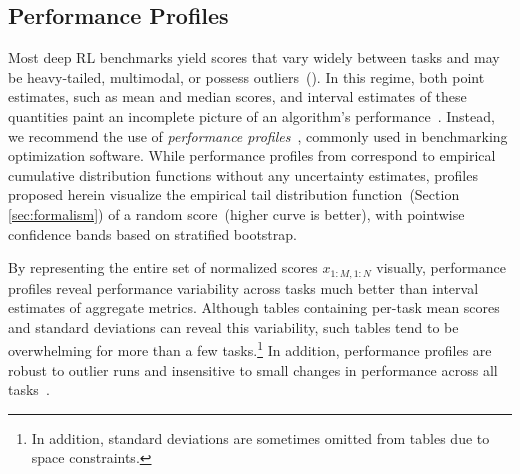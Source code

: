 
\vspace{-0.25cm}
\subsection{Performance Profiles}
\label{subsec:perf_profiles}
\vspace{-0.1cm}
Most deep RL benchmarks yield scores that vary widely between tasks and may be heavy-tailed, multimodal, or possess outliers~(\eg {}). In this regime, both point estimates, such as mean and median scores, and interval estimates of these quantities paint an incomplete picture of an algorithm's performance~\citep[][Section 3]{dehghani2021benchmark}. Instead, we recommend the use of \emph{performance profiles}~\citep{dolan2002benchmarking}, commonly used in benchmarking optimization software. While performance profiles from \citet{dolan2002benchmarking} correspond to empirical cumulative distribution functions without any uncertainty estimates, profiles proposed herein visualize the empirical tail distribution function~(Section \ref{sec:formalism}) of a random score~(higher curve is better),  with pointwise confidence bands based on stratified bootstrap. 


By representing the entire set of normalized scores $x_{1:M, 1:N}$ visually, performance profiles reveal performance variability across tasks much better than interval estimates of aggregate metrics. Although tables containing per-task mean scores and standard deviations can reveal this variability, such tables tend to be overwhelming for more than a few tasks.\footnote{In addition, standard deviations are sometimes omitted from tables due to space constraints.}
In addition, performance profiles are robust to outlier runs and insensitive to small changes in performance across all tasks~\citep{dolan2002benchmarking}.



